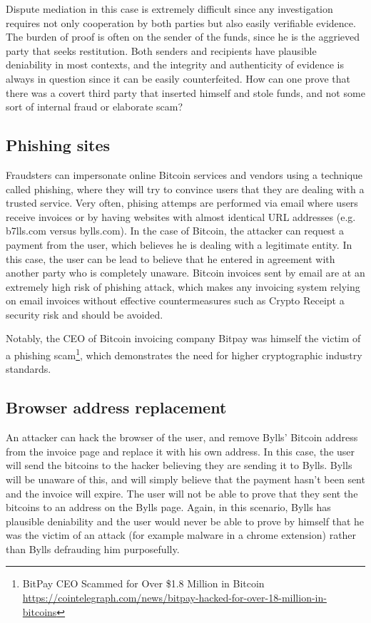 Dispute mediation in this case is extremely difficult since any investigation requires not only cooperation by both parties but also easily verifiable evidence. The burden of proof is often on the sender of the funds, since he is the aggrieved party that seeks restitution. Both senders and recipients have plausible deniability in most contexts, and the integrity and authenticity of evidence is always in question since it can be easily counterfeited. How can one prove that there was a covert third party that inserted himself and stole funds, and not some sort of internal fraud or elaborate scam?


\subsection{Phishing sites}
Fraudsters can impersonate online Bitcoin services and vendors using a technique called phishing, where they will try to convince users that they are dealing with a trusted service. Very often, phising attemps are performed via email where users receive invoices or by having websites with almost identical URL addresses (e.g. b7lls.com versus bylls.com). In the case of Bitcoin, the attacker can request a payment from the user, which believes he is dealing with a legitimate entity. In this case, the user can be lead to believe that he entered in agreement with another party who is completely unaware.  Bitcoin invoices sent by email are at an extremely high risk of phishing attack, which makes any invoicing system relying on email invoices without effective countermeasures such as Crypto Receipt a security risk and should be avoided.

Notably, the CEO of Bitcoin invoicing company Bitpay was himself the victim of a phishing scam\footnote{BitPay CEO Scammed for Over \$1.8 Million in Bitcoin \url{https://cointelegraph.com/news/bitpay-hacked-for-over-18-million-in-bitcoins}}, which demonstrates the need for higher cryptographic industry standards.


\subsection{Browser address replacement}
An attacker can hack the browser of the user, and remove Bylls’ Bitcoin address from the invoice page and replace it with his own address. In this case, the user will send the bitcoins to the hacker believing they are sending it to Bylls. Bylls will be unaware of this, and will simply believe that the payment hasn’t been sent and the invoice will expire. The user will not be able to prove that they sent the bitcoins to an address on the Bylls page. Again, in this scenario, Bylls has plausible deniability and the user would never be able to prove by himself that he was the victim of an attack (for example malware in a chrome extension) rather than Bylls defrauding him purposefully.


